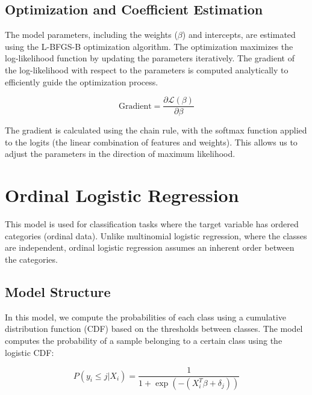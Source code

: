 \documentclass[fleqn,moreauthors,10pt]{ds_report}
\begin{document}
\subsection{Optimization and Coefficient Estimation}
The model parameters, including the weights (\(\beta\)) and intercepts, are estimated using the L-BFGS-B optimization algorithm. The optimization maximizes the log-likelihood function by updating the parameters iteratively. The gradient of the log-likelihood with respect to the parameters is computed analytically to efficiently guide the optimization process.

\[
\text{Gradient} = \frac{\partial \mathcal{L}(\beta)}{\partial \beta}
\]

The gradient is calculated using the chain rule, with the softmax function applied to the logits (the linear combination of features and weights). This allows us to adjust the parameters in the direction of maximum likelihood.


\section{Ordinal Logistic Regression}
This model is used for classification tasks where the target variable has ordered categories (ordinal data). Unlike multinomial logistic regression, where the classes are independent, ordinal logistic regression assumes an inherent order between the categories.

\subsection{Model Structure}
In this model, we compute the probabilities of each class using a cumulative distribution function (CDF) based on the thresholds between classes. The model computes the probability of a sample belonging to a certain class using the logistic CDF:

\[
P(y_i \leq j | X_i) = \frac{1}{1 + \exp(-(X_i^T \beta + \delta_j))}
\]
\end{document}
